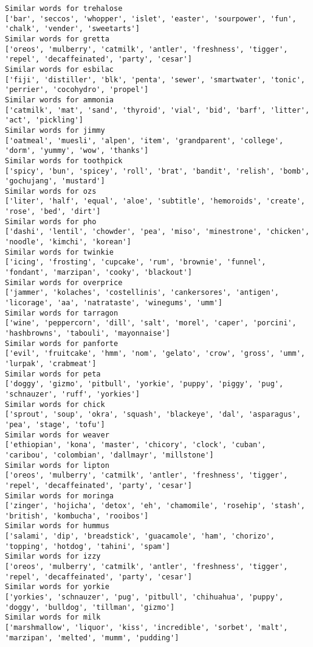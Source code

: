\documentclass[11pt]{article}
\begin{document}
\begin{Verbatim}[commandchars=\\\{\}]
Similar words for trehalose
['bar', 'seccos', 'whopper', 'islet', 'easter', 'sourpower', 'fun', 'chalk', 'vender', 'sweetarts']
Similar words for gretta
['oreos', 'mulberry', 'catmilk', 'antler', 'freshness', 'tigger', 'repel', 'decaffeinated', 'party', 'cesar']
Similar words for esbilac
['fiji', 'distiller', 'blk', 'penta', 'sewer', 'smartwater', 'tonic', 'perrier', 'cocohydro', 'propel']
Similar words for ammonia
['catmilk', 'mat', 'sand', 'thyroid', 'vial', 'bid', 'barf', 'litter', 'act', 'pickling']
Similar words for jimmy
['oatmeal', 'muesli', 'alpen', 'item', 'grandparent', 'college', 'dorm', 'yummy', 'wow', 'thanks']
Similar words for toothpick
['spicy', 'bun', 'spicey', 'roll', 'brat', 'bandit', 'relish', 'bomb', 'gochujang', 'mustard']
Similar words for ozs
['liter', 'half', 'equal', 'aloe', 'subtitle', 'hemoroids', 'create', 'rose', 'bed', 'dirt']
Similar words for pho
['dashi', 'lentil', 'chowder', 'pea', 'miso', 'minestrone', 'chicken', 'noodle', 'kimchi', 'korean']
Similar words for twinkie
['icing', 'frosting', 'cupcake', 'rum', 'brownie', 'funnel', 'fondant', 'marzipan', 'cooky', 'blackout']
Similar words for overprice
['jammer', 'kolaches', 'costellinis', 'cankersores', 'antigen', 'licorage', 'aa', 'natrataste', 'winegums', 'umm']
Similar words for tarragon
['wine', 'peppercorn', 'dill', 'salt', 'morel', 'caper', 'porcini', 'hashbrowns', 'tabouli', 'mayonnaise']
Similar words for panforte
['evil', 'fruitcake', 'hmm', 'nom', 'gelato', 'crow', 'gross', 'umm', 'lurpak', 'crabmeat']
Similar words for peta
['doggy', 'gizmo', 'pitbull', 'yorkie', 'puppy', 'piggy', 'pug', 'schnauzer', 'ruff', 'yorkies']
Similar words for chick
['sprout', 'soup', 'okra', 'squash', 'blackeye', 'dal', 'asparagus', 'pea', 'stage', 'tofu']
Similar words for weaver
['ethiopian', 'kona', 'master', 'chicory', 'clock', 'cuban', 'caribou', 'colombian', 'dallmayr', 'millstone']
Similar words for lipton
['oreos', 'mulberry', 'catmilk', 'antler', 'freshness', 'tigger', 'repel', 'decaffeinated', 'party', 'cesar']
Similar words for moringa
['zinger', 'hojicha', 'detox', 'eh', 'chamomile', 'rosehip', 'stash', 'british', 'kombucha', 'rooibos']
Similar words for hummus
['salami', 'dip', 'breadstick', 'guacamole', 'ham', 'chorizo', 'topping', 'hotdog', 'tahini', 'spam']
Similar words for izzy
['oreos', 'mulberry', 'catmilk', 'antler', 'freshness', 'tigger', 'repel', 'decaffeinated', 'party', 'cesar']
Similar words for yorkie
['yorkies', 'schnauzer', 'pug', 'pitbull', 'chihuahua', 'puppy', 'doggy', 'bulldog', 'tillman', 'gizmo']
Similar words for milk
['marshmallow', 'liquor', 'kiss', 'incredible', 'sorbet', 'malt', 'marzipan', 'melted', 'mumm', 'pudding']

\end{Verbatim}
\end{document}
